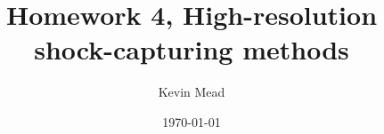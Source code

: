 \documentclass[a4paper]{article}
\begin{document}
 
\title{Homework 4, High-resolution shock-capturing methods} 
\author{Kevin Mead}

\date{\today} 
\maketitle 







\end{document}
